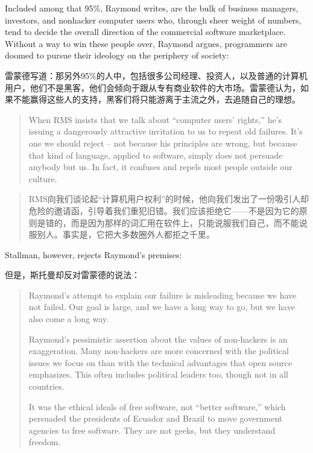 \ifdefined\eng
Included among that 95\%, Raymond writes, are the bulk of business managers, investors, and nonhacker computer users who, through sheer weight of numbers, tend to decide the overall direction of the commercial software marketplace. Without a way to win these people over, Raymond argues, programmers are doomed to pursue their ideology on the periphery of society:
\fi

\ifdefined\chs
雷蒙德写道：那另外95\%的人中，包括很多公司经理、投资人，以及普通的计算机用户，他们不是黑客，他们会倾向于跟从专有商业软件的大市场。雷蒙德认为，如果不能赢得这些人的支持，黑客们将只能游离于主流之外，去追随自己的理想。
\fi

\ifdefined\eng
\begin{quote}
When RMS insists that we talk about ``computer users' rights,'' he's issuing a dangerously attractive invitation to us to repeat old failures. It's one we should reject -- not because his principles are wrong, but because that kind of language, applied to software, simply does not persuade anybody but us. In fact, it confuses and repels most people outside our culture.
\end{quote}
\fi

\ifdefined\chs
\begin{quote}
RMS向我们谈论起``计算机用户权利''的时候，他向我们发出了一份吸引人却危险的邀请函，引导着我们重犯旧错。我们应该拒绝它——不是因为它的原则是错的，而是因为那样的词汇用在软件上，只能说服我们自己，而不能说服别人。事实是，它把大多数圈外人都拒之千里。
\end{quote}
\fi

\ifdefined\vtwo
\ifdefined\eng
Stallman, however, rejects Raymond's premises:
\fi

\ifdefined\chs
但是，斯托曼却反对雷蒙德的说法：
\fi

\ifdefined\eng
\begin{quote}
Raymond's attempt to explain our failure is misleading because we have not failed.  Our goal is large, and we have a long way to go, but we have also come a long way.

Raymond's pessimistic assertion about the values of non-hackers is an exaggeration.  Many non-hackers are more concerned with the political issues we focus on than with the technical advantages that open source emphasizes.  This often includes political leaders too, though not in all countries.

It was the ethical ideals of free software, not ``better software,'' which persuaded the presidents of Ecuador and Brazil to move government agencies to free software.  They are not geeks, but they understand freedom.
\end{quote}
\fi

